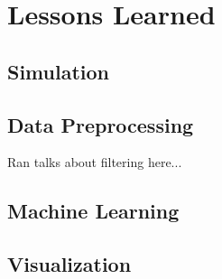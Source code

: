 \section{Lessons Learned}
\label{lessons}

\subsection{Simulation}


\subsection{Data Preprocessing}

Ran talks about filtering here...



\subsection{Machine Learning}

\subsection{Visualization}